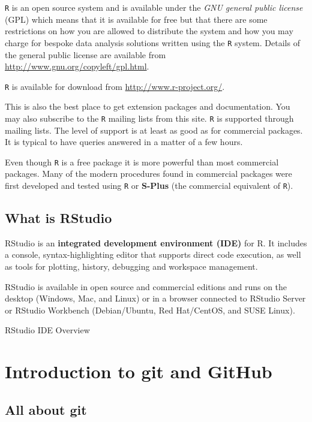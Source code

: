 \documentclass[
  12pt,
]{book}
\begin{document}
\texttt{R} is an open source system and is available under the \emph{GNU general public license} (GPL) which means that it is available for free but that there are some restrictions on how you are allowed to distribute the system and how you may charge for bespoke data analysis solutions written using the \texttt{R} system. Details of the general public license are available from \url{http://www.gnu.org/copyleft/gpl.html}.

\texttt{R} is available for download from \url{http://www.r-project.org/}.

This is also the best place to get extension packages and documentation. You may also subscribe to the \texttt{R} mailing lists from this site. \texttt{R} is supported through mailing lists. The level of support is at least as good as for commercial packages. It is typical to have queries answered in a matter of a few hours.

Even though \texttt{R} is a free package it is more powerful than most commercial packages. Many of the modern procedures found in commercial packages were first developed and tested using \texttt{R} or \textbf{S-Plus} (the commercial equivalent of \texttt{R}).

\hypertarget{what-rstudio}{%
\section{What is RStudio}\label{what-rstudio}}

RStudio is an \textbf{integrated development environment (IDE)} for R. It includes a console, syntax-highlighting editor that supports direct code execution, as well as tools for plotting, history, debugging and workspace management.

RStudio is available in open source and commercial editions and runs on the desktop (Windows, Mac, and Linux) or in a browser connected to RStudio Server or RStudio Workbench (Debian/Ubuntu, Red Hat/CentOS, and SUSE Linux).

RStudio IDE Overview

\hypertarget{intro-git}{%
\chapter{Introduction to git and GitHub}\label{intro-git}}

\hypertarget{all-about-git}{%
\section{All about git}\label{all-about-git}}
\end{document}
